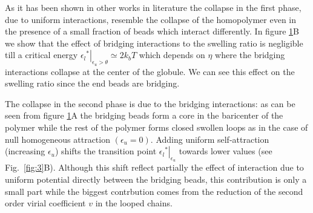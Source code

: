 \documentclass[
preprint,
a4paper,
12pt,
superscriptaddress,
pre]{revtex4}
\begin{document}
\begin{figure}
  \label{fig:4}
\end{figure}

As it has been shown in other works in literature the collapse in the
first phase, due to uniform interactions, resemble the collapse of the
homopolymer even in the presence of a small fraction of beads which
interact differently\cite{Dasmahapatra2006}. In figure \ref{fig:4}B we
show that the effect of bridging interactions to the swelling ratio is
negligible till a critical energy
$\left.{\epsilon_l}^*\right|_{\epsilon_u > \theta} \simeq 2k_bT$ which
depends on $\eta$ where the bridging interactions collapse at the
center of the globule. We can see this effect on the swelling ratio
since the end beads are bridging.

The collapse in the second phase is due to the bridging interactions:
as can be seen from figure \ref{fig:4}A the bridging beads form a core
in the baricenter of the polymer while the rest of the polymer forms
closed swollen loops as in the case of null homogeneous attraction
$(\epsilon_u = 0)$. Adding uniform self-attraction (increasing
$\epsilon_u$) shifts the transition point
$\left.{\epsilon_l}^*\right|_{\epsilon_u}$ towards lower values (see
Fig.~\ref{fig:3}B). Although this shift reflect partially the effect of
interaction due to uniform potential directly between the bridging
beads, this contribution is only a small part while the biggest
contrbution comes from the reduction of the second order virial
coefficient $v$ in the looped chains.
\end{document}
